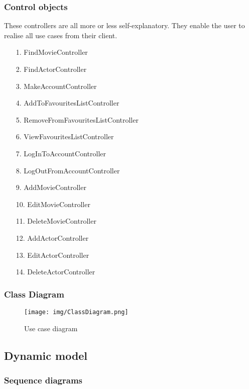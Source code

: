 \subsubsection{Control objects}

These controllers are all more or less self-explanatory. They enable the user to realise all use cases from their client.

\begin{enumerate}
	\item[1.] FindMovieController
	\item[2.] FindActorController
	\item[3.] MakeAccountController 
	\item[4.] AddToFavouritesListController
	\item[5.] RemoveFromFavouritesListController
	\item[6.] ViewFavouritesListController
	\item[7.] LogInToAccountController
	\item[8.] LogOutFromAccountController 
	
	\item[9.] AddMovieController
 	\item[10.] EditMovieController
 	\item[11.] DeleteMovieController
 	\item[12.] AddActorController
 	\item[13.] EditActorController
 	\item[14.] DeleteActorController
 	
\end{enumerate}

\subsubsection{Class Diagram}

\begin{figure}[H]
\texttt{[image: img/ClassDiagram.png]}
\caption{Use case diagram}
\label{fig:use case diagram}
\end{figure}

\subsection{Dynamic model}

\subsubsection{Sequence diagrams}

